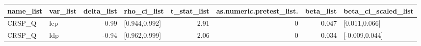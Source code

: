 \begin{table}[ht]
\centering
\begin{tabular}{llrlrrrl}
  \hline
name\_list & var\_list & delta\_list & rho\_ci\_list & t\_stat\_list & as.numeric.pretest\_list. & beta\_list & beta\_ci\_scaled\_list \\ 
  \hline
CRSP\_Q & lep & -0.99 & [0.944,0.992] & 2.91 & 0 & 0.047 & [0.011,0.066] \\ 
  CRSP\_Q & ldp & -0.94 & [0.962,0.999] & 2.06 & 0 & 0.034 & [-0.009,0.044] \\ 
   \hline
\end{tabular}
\end{table}
